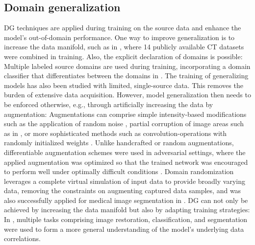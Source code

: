    \subsection{Domain generalization} %
    DG techniques are applied during training on the source data and enhance the model’s out-of-domain performance. One way to improve generalization is to increase the data manifold, such as in \cite{liu2023clip}, where 14 publicly available CT datasets were combined in training. Also, the explicit declaration of domains is possible: Multiple labeled source domains are used during training, incorporating a domain classifier that differentiates between the domains in  \cite{hu2022domain}.
    The training of generalizing models has also been studied with limited, single-source data. This removes the burden of extensive data acquisition. However, model generalization then needs to be enforced otherwise, e.g., through artificially increasing the data by augmentation:
    Augmentations can comprise simple intensity-based modifications such as the application of random noise \cite{zhou2022domain}, partial corruption of image areas such as in \cite{devries2017improved,he2022masked,hoyer2023mic},
    or more sophisticated methods such as convolution-operations with randomly initialized weights  \cite{xu2020robust,ouyang2022causality}.
    Unlike handcrafted or random augmentations, differentiable augmentation schemes were used in adversarial settings, where the applied augmentation was optimized so that the trained network was encouraged to perform well under optimally difficult conditions \cite{zhou2020deep, hu2022domain}.
    Domain randomization \cite{tobin2017domain} leverages a complete virtual simulation of input data to provide broadly varying data, removing the constraints on augmenting captured data samples, and was also successfully applied for medical image segmentation in \cite{billot2023synthseg}.
    DG can not only be achieved by increasing the data manifold but also by adapting training strategies: In \cite{bucci2021self, zhou2021models}, multiple tasks comprising image restoration, classification, and segmentation were used to form a more general understanding of the model’s underlying data correlations.

